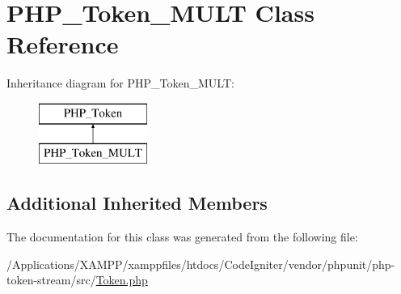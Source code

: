\hypertarget{class_p_h_p___token___m_u_l_t}{}\section{P\+H\+P\+\_\+\+Token\+\_\+\+M\+U\+LT Class Reference}
\label{class_p_h_p___token___m_u_l_t}
Inheritance diagram for P\+H\+P\+\_\+\+Token\+\_\+\+M\+U\+LT\+:\begin{figure}[H]
\begin{center}
\leavevmode
\includegraphics[height=2.000000cm]{class_p_h_p___token___m_u_l_t}
\end{center}
\end{figure}
\subsection*{Additional Inherited Members}


The documentation for this class was generated from the following file\+:\begin{DoxyCompactItemize}
\item 
/\+Applications/\+X\+A\+M\+P\+P/xamppfiles/htdocs/\+Code\+Igniter/vendor/phpunit/php-\/token-\/stream/src/\mbox{\hyperlink{_token_8php}{Token.\+php}}\end{DoxyCompactItemize}
